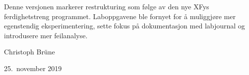\documentclass[../Elmag-labhefte-2021.tex]{subfiles}
\begin{document}












\bigskip

Denne versjonen markerer restrukturing som følge av den nye XFys ferdighetstreng programmet. Laboppgavene ble fornyet for å muliggjøre mer egenstendig eksperimentering, sette fokus på dokumentasjon med labjournal og introdusere mer feilanalyse. 

\bigskip
\hfill Christoph Br\"une

\vspace{2mm}

\hfill 25.\ november 2019
\end{document}
